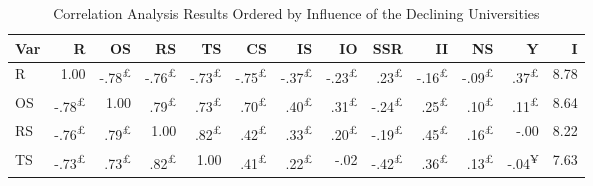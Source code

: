 \documentclass{singlecol-new}
\theoremstyle{TH}{
\newtheorem{lemma}{Lemma}
\newtheorem{theorem}[lemma]{Theorem}
\newtheorem{corrolary}[lemma]{Corrolary}
\newtheorem{conjecture}[lemma]{Conjecture}
\newtheorem{proposition}[lemma]{Proposition}
\newtheorem{claim}[lemma]{Claim}
\newtheorem{stheorem}[lemma]{Wrong Theorem}
\newtheorem{algorithm}{Algorithm}
}
\theoremstyle{THrm}{
\newtheorem{definition}{Definition}[section]
\newtheorem{question}{Question}[section]
\newtheorem{remark}{Remark}
\newtheorem{scheme}{Scheme}
}
\theoremstyle{THhit}{
\newtheorem{case}{Case}[section]
}
\begin{document}
\begin{table*}[h!]
	\centering
	\caption{Correlation Analysis Results Ordered by Influence of the Declining Universities}
	\label{tab:correlation_combined_colored}
	\scriptsize
	\begin{tabular}{lrrrrrrrrrrrr}
		\hline
		\textbf{Var} & \textbf{R} & \textbf{OS} & \textbf{RS} & \textbf{TS} & \textbf{CS} & \textbf{IS} & \textbf{IO} & \textbf{SSR} & \textbf{II} & \textbf{NS} & \textbf{Y} & \textbf{I} \\ \hline
		
		R  & \cellcolor{gray!50}1.00 & \cellcolor{gray!39}-.78\textsuperscript{£} & \cellcolor{gray!38}-.76\textsuperscript{£} & \cellcolor{gray!36}-.73\textsuperscript{£} & \cellcolor{gray!37}-.75\textsuperscript{£} & \cellcolor{gray!18}-.37\textsuperscript{£} & \cellcolor{gray!11}-.23\textsuperscript{£} & \cellcolor{gray!11}.23\textsuperscript{£} & \cellcolor{gray!8}-.16\textsuperscript{£} & \cellcolor{gray!4}-.09\textsuperscript{£} & \cellcolor{gray!18}.37\textsuperscript{£} & 8.78 \\
		OS & \cellcolor{gray!39}-.78\textsuperscript{£} & \cellcolor{gray!50}1.00 & \cellcolor{gray!39}.79\textsuperscript{£} & \cellcolor{gray!36}.73\textsuperscript{£} & \cellcolor{gray!35}.70\textsuperscript{£} & \cellcolor{gray!20}.40\textsuperscript{£} & \cellcolor{gray!15}.31\textsuperscript{£} & \cellcolor{gray!12}-.24\textsuperscript{£} & \cellcolor{gray!12}.25\textsuperscript{£} & \cellcolor{gray!5}.10\textsuperscript{£} & \cellcolor{gray!5}.11\textsuperscript{£} & 8.64 \\
		RS & \cellcolor{gray!38}-.76\textsuperscript{£} & \cellcolor{gray!39}.79\textsuperscript{£} & \cellcolor{gray!50}1.00 & \cellcolor{gray!41}.82\textsuperscript{£} & \cellcolor{gray!21}.42\textsuperscript{£} & \cellcolor{gray!16}.33\textsuperscript{£} & \cellcolor{gray!10}.20\textsuperscript{£} & \cellcolor{gray!9}-.19\textsuperscript{£} & \cellcolor{gray!22}.45\textsuperscript{£} & \cellcolor{gray!8}.16\textsuperscript{£} & \cellcolor{gray!0}-.00 & 8.22 \\
		TS & \cellcolor{gray!36}-.73\textsuperscript{£} & \cellcolor{gray!36}.73\textsuperscript{£} & \cellcolor{gray!41}.82\textsuperscript{£} & \cellcolor{gray!50}1.00 & \cellcolor{gray!20}.41\textsuperscript{£} & \cellcolor{gray!11}.22\textsuperscript{£} & \cellcolor{gray!1}-.02 & \cellcolor{gray!21}-.42\textsuperscript{£} & \cellcolor{gray!18}.36\textsuperscript{£} & \cellcolor{gray!6}.13\textsuperscript{£} & \cellcolor{gray!2}-.04\textsuperscript{¥} & 7.63 \\

\end{tabular}
\end{table*}
\end{document}
